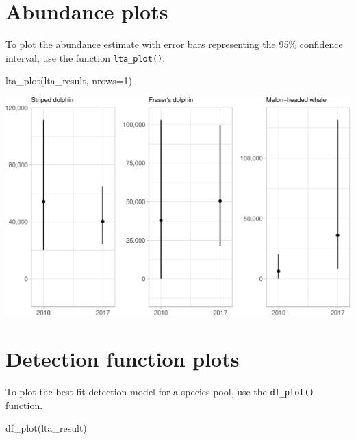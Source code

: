 \documentclass[
]{book}
\newenvironment{Shaded}{\begin{snugshade}}{\end{snugshade}}
\newcommand{\AttributeTok}[1]{\textcolor[rgb]{0.77,0.63,0.00}{#1}}
\newcommand{\DecValTok}[1]{\textcolor[rgb]{0.00,0.00,0.81}{#1}}
\newcommand{\FunctionTok}[1]{\textcolor[rgb]{0.00,0.00,0.00}{#1}}
\newcommand{\NormalTok}[1]{#1}
\begin{document}
\hypertarget{abundance-plots}{%
\section*{Abundance plots}\label{abundance-plots}}

To plot the abundance estimate with error bars representing the 95\% confidence interval, use the function \texttt{lta\_plot()}:

\begin{Shaded}
\begin{Highlighting}[]
\FunctionTok{lta\_plot}\NormalTok{(lta\_result, }
         \AttributeTok{nrows=}\DecValTok{1}\NormalTok{)}
\end{Highlighting}
\end{Shaded}

\includegraphics{figures/unnamed-chunk-320-1.pdf}

\hypertarget{detection-function-plots}{%
\section*{Detection function plots}\label{detection-function-plots}}

To plot the best-fit detection model for a species pool, use the \texttt{df\_plot()} function.

\begin{Shaded}
\begin{Highlighting}[]
\FunctionTok{df\_plot}\NormalTok{(lta\_result)}
\end{Highlighting}
\end{Shaded}
\end{document}
